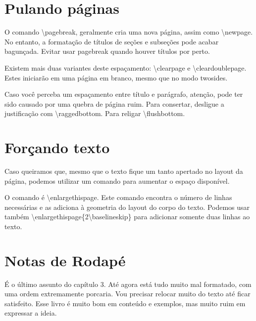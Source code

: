 \section[Pulando páginas]{Pulando páginas}
O comando \textbackslash pagebreak, geralmente cria uma nova página,
assim como \textbackslash newpage.
No entanto, a formatação de títulos de seções e subseções pode acabar bagunçada.
Evitar usar pagebreak quando houver títulos por perto.

Existem mais duas variantes deste espaçamento: 
\textbackslash clearpage e \textbackslash cleardoublepage.
Estes iniciarão em uma página em branco, mesmo que no modo twosides.

Caso você perceba um espaçamento entre título e parágrafo,
atenção, pode ter sido causado por uma quebra de página ruim.
Para consertar, desligue a justificação com \textbackslash raggedbottom.
Para religar \textbackslash flushbottom.

\section{Forçando texto}
Caso queiramos que, mesmo que o texto fique um tanto apertado no layout da
página, podemos utilizar um comando para aumentar o espaço disponível.

O comando é \textbackslash enlargethispage.  Este comando encontra o número de
linhas necessárias e as adiciona à geometria do layout do corpo do texto.
Podemos usar também \textbackslash enlargethispage\{2\textbackslash baselineskip\} para
adicionar somente duas linhas ao texto.

\section{Notas de Rodapé}
É o último assunto do capítulo 3.
Até agora está tudo muito mal formatado, com uma ordem extremamente porcaria.
Vou precisar relocar muito do texto até ficar satisfeito.
Esse livro é muito bom em conteúdo e exemplos, mas muito ruim em expressar a ideia.

\newpage
